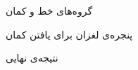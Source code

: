 \documentclass[12pt,a4paper]{article}
\numberwithin{equation}{section}
\numberwithin{figure}{section}
\theoremstyle{definition}
\theoremstyle{theorem}
\theoremstyle{definition}
\begin{document}
\begin{figure}[h]
\centering
{}
\caption{گروه‌های خط و کمان \cite{geo}}
\label{fig:ell-geo}
\end{figure}

\newpage 

\begin{figure}[h]
\centering
{}
\caption{پنجره‌ی لغزان برای یافتن کمان \cite{geo}}
\label{fig:ell-geo}
\end{figure}


\begin{figure}[h]
\centering
{}
\caption{نتیجه‌ی نهایی \cite{geo}}
\label{fig:res1}
\end{figure}
\end{document}
